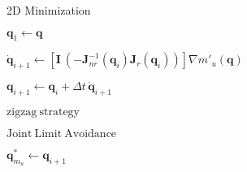 \begin{algorithm}[H]
	\caption{2D Minimization}
	\label{alg:2D_alg}
	\begin{algorithmic}[1]
		\State $\mathbf{q}_1 \leftarrow \mathbf{q}$

		
		
		
		\State $\dot{\mathbf{q}}_{i+1} \leftarrow  \left[\mathbf{I} \ (-\mathbf{J}_{nr}^{-1}(\mathbf{q}_i) \mathbf{J}_r(\mathbf{q}_i))  \right ]  \nabla m'_u(\mathbf{q}) $ \label{2D_alg:line:select}
		
		
		\State $\mathbf{q}_{i+1} \leftarrow \mathbf{q}_i + \Delta t \, \dot{\mathbf{q}}_{i+1}$
		
		\State $\mathrm{zigzag \ strategy}$ \label{2D_alg:line:zigzag}
		
		
		
		\State $\mathrm{Joint\ Limit\ Avoidance \ }$ \label{2D_alg:line:JLA}
		
	

		\EndIf
		
		\State $\mathbf{q}_{m_u}^\ast \leftarrow \mathbf{q}_{i+1}$ 
		
		
		
		
		\EndFor
	\end{algorithmic}
\end{algorithm}







